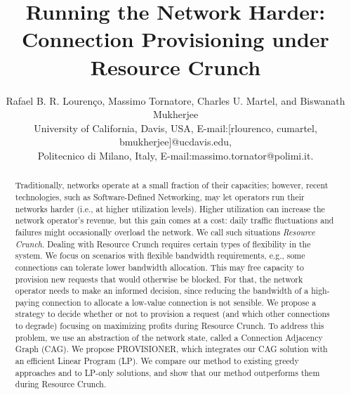 \documentclass[journal]{IEEEtran}
\begin{document}
\title{Running the Network Harder:\\Connection Provisioning under Resource Crunch}

\author{Rafael B. R. Louren\c{c}o, Massimo Tornatore, Charles U. Martel, and Biswanath Mukherjee
\\\small{}University of California, Davis, USA, E-mail:[rlourenco, cumartel, bmukherjee]@ucdavis.edu, \\\small{}Politecnico di Milano, Italy, E-mail:massimo.tornator@polimi.it.}

\maketitle
\thispagestyle{plain}

\begin{abstract}
Traditionally, networks operate at a small fraction of their capacities; however, recent technologies, such as Software-Defined Networking, may let operators run their networks harder (i.e., at higher utilization levels). Higher utilization can increase the network operator's revenue, but this gain comes at a cost: daily traffic fluctuations and failures might occasionally overload the network. We call such situations \textit{Resource Crunch}. Dealing with Resource Crunch requires certain types of flexibility in the system. We focus on scenarios with flexible bandwidth requirements, e.g., some connections can tolerate lower bandwidth allocation. This may free capacity to provision new requests that would otherwise be blocked. For that, the network operator needs to make an informed decision, since reducing the bandwidth of a high-paying connection to allocate a low-value connection is not sensible. We propose a strategy to decide whether or not to provision a request (and which other connections to degrade) focusing on maximizing profits during Resource Crunch. To address this problem, we use an abstraction of the network state, called a Connection Adjacency Graph (CAG). We propose PROVISIONER, which integrates our CAG solution with an efficient Linear Program (LP). We compare our method to existing greedy approaches and to LP-only solutions, and show that our method outperforms them during Resource Crunch. 
\end{abstract}
\end{document}
